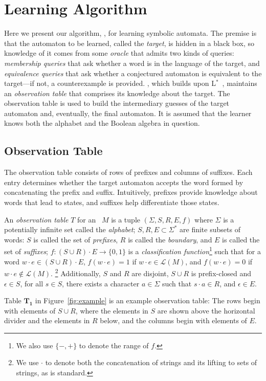 \section{Learning Algorithm}
\label{sec:learning}

Here we present our algorithm, \alg,
for learning symbolic automata.
The premise is that the automaton to be learned,
called the \emph{target},
is hidden in a black box,
so knowledge of it comes from some \emph{oracle}
that admits two kinds of queries:
\emph{membership queries} that ask
whether a word is in the language of the target, and
\emph{equivalence queries} that ask
whether a conjectured automaton is equivalent
to the target---if not, a 
counterexample is provided.
\alg, which builds upon L$^*$~\cite{angluin87},
maintains an \emph{observation table}
that comprises its knowledge about the target.
The observation table is used to build the intermediary guesses of the target automaton
and, eventually, the final automaton.
It is assumed that the learner knows
both the alphabet and the Boolean algebra in question. 

\subsection{Observation Table}

The observation table consists of
rows of prefixes and columns of suffixes.
Each entry determines whether the target automaton
accepts the word formed by concatenating
the prefix and suffix.
Intuitively, prefixes
provide knowledge about words that
lead to states,
and suffixes help differentiate those states.

\begin{definition}
    An \emph{observation table} $T$ for an \SFA\ $M$
    is a tuple $(\Sigma, S, R, E, f)$ where
    $\Sigma$ is a potentially infinite set called the \emph{alphabet};
    $S,R,E \subset \Sigma^*$ are finite subsets of words:
        $S$ is called the set of \emph{prefixes}, 
        $R$ is called the \emph{boundary},
        and $E$ is called the set of \emph{suffixes};
    $f : (S \cup R) \cdot E \rightarrow \{0,1\}$
        is a \emph{classification function}\footnote{We
        also use $\{-,+\}$ to denote the range of $f$.}
        such that
        for a word $w \cdot e \in (S \cup R) \cdot E$,
        $f(w \cdot e) = 1$ if $w \cdot e \in \mathcal{L}(M)$, and
        $f(w \cdot e) = 0$ if $w \cdot e \not\in \mathcal{L}(M)$.%
        \footnote{We use $\cdot$ to denote both the concatenation
        of strings and its lifting to sets of strings,
        as is standard.}
    Additionally, %
    \rone $S$ and $R$ are disjoint,
    \rtwo $S \cup R$ is prefix-closed and $\epsilon \in S$,
    \rthree for all $s \in S$, there exists a character $a \in \Sigma$ such that $s \cdot a \in R$,
    and \rfour $\epsilon \in E$.
\end{definition}
%
Table $\mathbf{T_1}$ in Figure~\ref{fig:example} is an example observation table:
The rows begin with elements of $S \cup R$,
where the elements in $S$ are shown above the horizontal divider
and the elements in $R$ below,
and the columns begin with elements of $E$.

